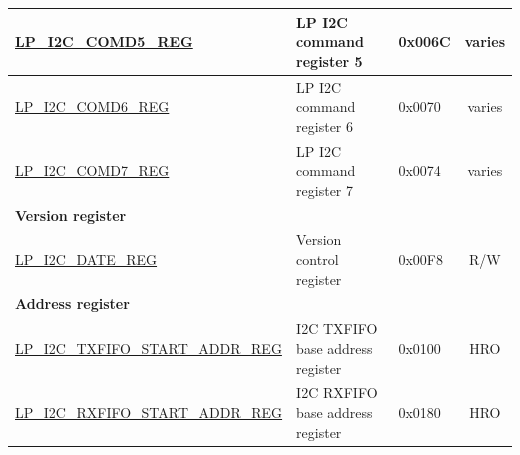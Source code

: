 \begin{longtable}{ | p{6.1cm} | p{6.8cm} | p{1.3cm} | c | }
\hyperref[regdesc:LPI2CCOMD5REG]{LP\_I2C\_COMD5\_REG} & LP I2C command register 5 & 0x006C & varies \\ \hline
\hyperref[regdesc:LPI2CCOMD6REG]{LP\_I2C\_COMD6\_REG} & LP I2C command register 6 & 0x0070 & varies \\ \hline
\hyperref[regdesc:LPI2CCOMD7REG]{LP\_I2C\_COMD7\_REG} & LP I2C command register 7 & 0x0074 & varies \\ \hline
\multicolumn{4}{|l|}{\textbf{Version register}} \\ \hline
\hyperref[regdesc:LPI2CDATEREG]{LP\_I2C\_DATE\_REG} & Version control register & 0x00F8 & R/W \\ \hline
\multicolumn{4}{|l|}{\textbf{Address register}} \\ \hline
\hyperref[regdesc:LPI2CTXFIFOSTARTADDRREG]{LP\_I2C\_TXFIFO\_START\_ADDR\_REG} & I2C TXFIFO base address register & 0x0100 & HRO \\ \hline
\hyperref[regdesc:LPI2CRXFIFOSTARTADDRREG]{LP\_I2C\_RXFIFO\_START\_ADDR\_REG} & I2C RXFIFO base address register & 0x0180 & HRO \\ \hline
\end{longtable}
